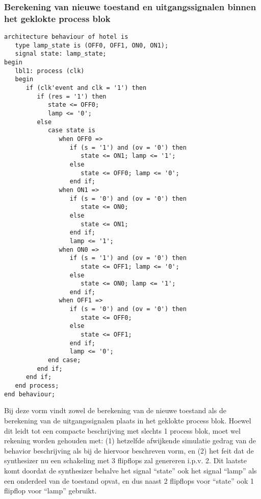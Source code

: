 \subsubsection{Berekening van nieuwe toestand en uitgangssignalen binnen het geklokte process blok}
\begin{small}
\begin{verbatim}
architecture behaviour of hotel is
   type lamp_state is (OFF0, OFF1, ON0, ON1);
   signal state: lamp_state;
begin
   lbl1: process (clk)
   begin
      if (clk'event and clk = '1') then
         if (res = '1') then
            state <= OFF0;
            lamp <= '0';
         else 
            case state is
               when OFF0 =>
                  if (s = '1') and (ov = '0') then
                     state <= ON1; lamp <= '1';
                  else
                     state <= OFF0; lamp <= '0';
                  end if;
               when ON1 =>
                  if (s = '0') and (ov = '0') then
                     state <= ON0;
                  else
                     state <= ON1;
                  end if;
                  lamp <= '1';
               when ON0 =>
                  if (s = '1') and (ov = '0') then
                     state <= OFF1; lamp <= '0';
                  else
                     state <= ON0; lamp <= '1';
                  end if;
               when OFF1 =>
                  if (s = '0') and (ov = '0') then
                     state <= OFF0;
                  else
                     state <= OFF1;
                  end if;
                  lamp <= '0';
            end case;
         end if;
      end if;
   end process;
end behaviour;
\end{verbatim}
\end{small}
Bij deze vorm vindt zowel de berekening van de nieuwe toestand als de
berekening van de uitgangssignalen plaats in het geklokte process blok.
Hoewel dit leidt tot een compacte beschrijving met slechts 1 process
blok, moet wel rekening worden gehouden met:
(1) hetzelfde afwijkende simulatie gedrag van
de behavior beschrijving als bij de hiervoor beschreven vorm, en
(2) het feit dat de synthesizer nu een schakeling met 3 flipflops
zal genereren i.p.v. 2.
Dit laatste komt doordat de synthesizer behalve het signal ``state''
ook het signal ``lamp'' als een onderdeel van de toestand opvat,
en dus naast 2 flipflops voor ``state'' ook 1 flipflop voor ``lamp'' gebruikt.

